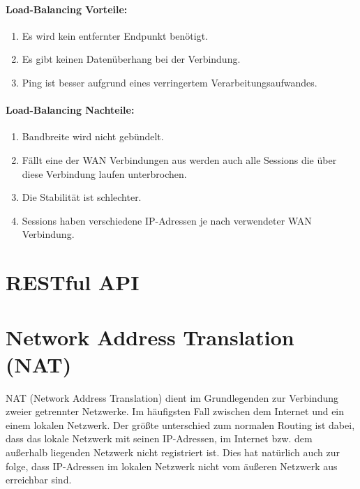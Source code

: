 \paragraph{Load-Balancing Vorteile:}
\begin{enumerate}
    \item Es wird kein entfernter Endpunkt benötigt.
    \item Es gibt keinen Datenüberhang bei der Verbindung.
    \item Ping ist besser aufgrund eines verringertem Verarbeitungsaufwandes. 
\end{enumerate}
\paragraph{Load-Balancing Nachteile:}
\begin{enumerate}
    \item Bandbreite wird nicht gebündelt.
    \item Fällt eine der WAN Verbindungen aus werden auch alle Sessions die über diese Verbindung laufen unterbrochen.
    \item Die Stabilität ist schlechter.
    \item Sessions haben verschiedene IP-Adressen je nach verwendeter WAN Verbindung.
\end{enumerate}


\section{RESTful API}
\section{Network Address Translation (NAT)}
NAT (Network Address Translation) dient im Grundlegenden zur Verbindung zweier getrennter Netzwerke. Im häufigsten Fall zwischen dem Internet und ein einem lokalen Netzwerk. Der größte unterschied zum normalen Routing ist dabei, dass das lokale Netzwerk mit seinen IP-Adressen, im Internet bzw. dem außerhalb liegenden Netzwerk nicht registriert ist. Dies hat natürlich auch zur folge, dass IP-Adressen im lokalen Netzwerk nicht vom äußeren Netzwerk aus erreichbar sind. 
